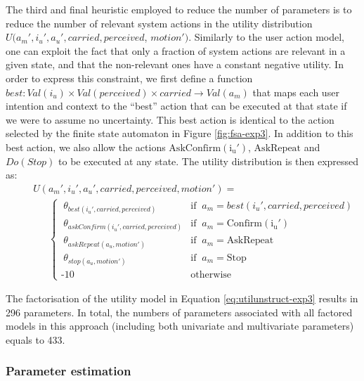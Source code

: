 The third and final heuristic employed to reduce the number of parameters is to reduce the number of relevant system actions in the utility distribution $U(a_m', i_u', a_u', \mathit{carried}, \mathit{perceived}$, $\mathit{motion'})$.  Similarly to the user action model, one can exploit the fact that only a fraction of system actions are relevant in a given state, and that the non-relevant ones have a constant negative utility. In order to express this constraint, we first define a function $best: Val(i_u) \times Val(\mathit{perceived}) \times \mathit{carried} \rightarrow Val(a_m)$ that maps each user intention and context to the ``best'' action that can be executed at that state if we were to assume no uncertainty. This best action is identical to the action selected by the finite state automaton in Figure \ref{fig:fsa-exp3}. In addition to this best action, we also allow the actions $\mathrm{AskConfirm(i_u')}$, $\mathrm{AskRepeat}$ and $Do(Stop)$ to be executed at any state. The utility distribution is then expressed as: 
\begin{align}
&&& U(a_m', i_u', a_u', \mathit{carried}, \mathit{perceived}, \mathit{motion'}) = \nonumber \\
&&& \ \ \ \ \ \ \  \begin{cases} \ \theta_{best(i_u', \mathit{carried}, \mathit{perceived})} & \text{if } \ a_m = best(i_u', \mathit{carried}, \mathit{perceived}) \\ 
\ \theta_{askConfirm(i_u', \mathit{carried}, \mathit{perceived})} & \text{if } \ a_m = \mathrm{Confirm(i_u')} \\
\ \theta_{askRepeat(a_u, \mathit{motion'})} & \text{if } \ a_m = \mathrm{AskRepeat} \\
\ \theta_{stop(a_u,\mathit{motion'})} & \text{if } \ a_m = \mathrm{Stop} \\ 
\mbox{-}10 & \text{otherwise}
\end{cases} \label{eq:utilunstruct-exp3}
\end{align}

The factorisation of the utility model in Equation \eqref{eq:utilunstruct-exp3} results in 296 parameters. In total, the numbers of parameters associated with all factored models in this approach (including both univariate and multivariate parameters) equals to 433.

\subsubsection*{Parameter estimation}

